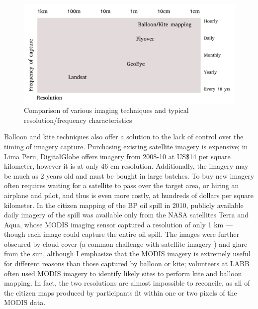 \documentclass[11pt,oneside,notitlepage]{report}
\begin{document}
\begin{figure}[h]
  \begin{center}
	\includegraphics[width=1\textwidth]{diagrams/resolution-frequency.pdf}
	\caption{Comparison of various imaging techniques and typical resolution/frequency characteristics}
  \end{center}
\end{figure}

Balloon and kite techniques also offer a solution to the lack of control over the timing of imagery capture. Purchasing existing satellite imagery is expensive; in Lima Peru, DigitalGlobe offers imagery from 2008-10 at US\$14 per square kilometer, however it is at only 46 cm resolution. Additionally, the imagery may be much as 2 years old and must be bought in large batches. \cite{digitalglobe2010mapmart} To buy new imagery often requires waiting for a satellite to pass over the target area, or hiring an airplane and pilot, and thus is even more costly, at hundreds of dollars per square kilometer. \cite{mumby1999cost} In the citizen mapping of the BP oil spill in 2010, publicly available daily imagery of the spill was available only from the NASA satellites Terra and Aqua, whose \ac{MODIS} imaging sensor captured a resolution of only 1 km --- though each image could capture the entire oil spill. The images were further obscured by cloud cover (a common challenge with satellite imagery \cite{miyamoto2004use}) and glare from the sun, although I emphasize that the \ac{MODIS} imagery is extremely useful for different reasons than those captured by balloon or kite; volunteers at \ac{LABB} often used \ac{MODIS} imagery to identify likely sites to perform kite and balloon mapping. In fact, the two resolutions are almost impossible to reconcile, as all of the citizen maps produced by participants fit within one or two pixels of the \ac{MODIS} data.
\end{document}
